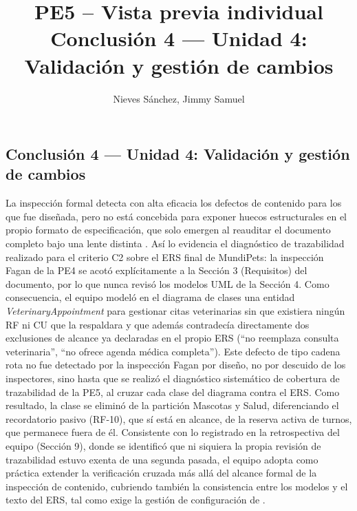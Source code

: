 \documentclass[12pt,a4paper]{article}
\title{PE5 -- Vista previa individual\\Conclusión 4 --- Unidad 4: Validación y gestión de cambios}
\author{Nieves Sánchez, Jimmy Samuel}
\date{}
\begin{document}
\maketitle



\subsection*{Conclusión 4 --- Unidad 4: Validación y gestión de cambios}

La inspección formal detecta con alta eficacia los defectos de contenido para
los que fue diseñada, pero no está concebida para exponer huecos
estructurales en el propio formato de especificación, que solo emergen al
reauditar el documento completo bajo una lente distinta \citep{wohlin2012}.
Así lo evidencia el diagnóstico de trazabilidad realizado para el criterio
C2 sobre el ERS final de MundiPets: la inspección Fagan de la PE4 se acotó
explícitamente a la Sección 3 (Requisitos) del documento, por lo que nunca
revisó los modelos UML de la Sección 4. Como consecuencia, el equipo modeló
en el diagrama de clases una entidad \textit{VeterinaryAppointment} para
gestionar citas veterinarias sin que existiera ningún RF ni CU que la
respaldara y que además contradecía directamente dos exclusiones de
alcance ya declaradas en el propio ERS (``no reemplaza consulta
veterinaria'', ``no ofrece agenda médica completa''). Este defecto de tipo
cadena rota no fue detectado por la inspección Fagan por diseño, no por
descuido de los inspectores, sino hasta que se realizó el diagnóstico
sistemático de cobertura de trazabilidad de la PE5, al cruzar cada clase del
diagrama contra el ERS. Como resultado, la clase se eliminó de la partición
Mascotas y Salud, diferenciando el recordatorio pasivo (RF-10), que sí está
en alcance, de la reserva activa de turnos, que permanece fuera de él.
Consistente con lo registrado en la retrospectiva del equipo (Sección 9),
donde se identificó que ni siquiera la propia revisión de trazabilidad
estuvo exenta de una segunda pasada, el equipo adopta como práctica extender
la verificación cruzada más allá del alcance formal de la inspección de
contenido, cubriendo también la consistencia entre los modelos y el texto
del ERS, tal como exige la gestión de configuración de \citep{ieee29148}.


\end{document}
